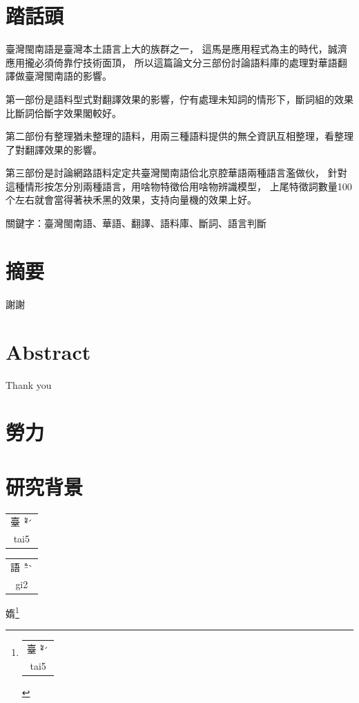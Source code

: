 \documentclass[final,oneside,onecolumn,12pt,a4paper]{book}%
\makeatletter
\newcommand{\rubybot}[2]{
  \@tempdimc \f@size\p@
  \begin{tabular}[t]{@{}c@{}}
    #1\\[-3em]
    \fontsize{.8\@tempdimc}{.8\@tempdimc}\selectfont%
    \setlength{\normalbaselineskip}{0pt}#2 
  \end{tabular}%
}
\makeatother
\begin{document}
\frontmatter
\chapter{踏話頭}
臺灣閩南語是臺灣本土語言上大的族群之一，
這馬是應用程式為主的時代，誠濟應用攏必須倚靠佇技術面頂，
所以這篇論文分三部份討論語料庫的處理對華語翻譯做臺灣閩南語的影響。

第一部份是語料型式對翻譯效果的影響，佇有處理未知詞的情形下，斷詞組的效果比斷詞佮斷字效果閣較好。

第二部份有整理猶未整理的語料，用兩三種語料提供的無仝資訊互相整理，看整理了對翻譯效果的影響。

第三部份是討論網路語料定定共臺灣閩南語佮北京腔華語兩種語言濫做伙，
針對這種情形按怎分別兩種語言，用啥物特徵佮用啥物辨識模型，
上尾特徵詞數量100个左右就會當得著袂禾黑的效果，支持向量機的效果上好。

關鍵字：臺灣閩南語、華語、翻譯、語料庫、斷詞、語言判斷
\newpage

\chapter{摘要}
謝謝

\newpage

\chapter{Abstract}

Thank you

\newpage

\chapter{勞力}

\newpage

\tableofcontents
\listoffigures
\listoftables

\mainmatter

\chapter{研究背景}
\label{章：研究背景}

\rubybot{臺 \includegraphics[height=1em]{圖/⿳⿳ㄉㄞˊ}}{tai5}
\rubybot{語 \includegraphics[height=1em]{圖/⿳⿳ㆣㄧˋ}}{gi2}
媠\footnote{\rubybot{臺 \includegraphics[height=1em]{圖/⿳⿳ㄉㄞˊ}}{tai5}}
\end{document}
